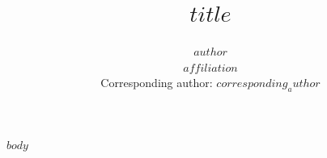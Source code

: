 \documentclass[12pt]{article}
\title{\textbf{$title$}}
\author{$author$\\
\small $affiliation$\\
\small Corresponding author: $corresponding_author$}
\date{}
\begin{document}
\maketitle
\linenumbers

$body$
\end{document}
